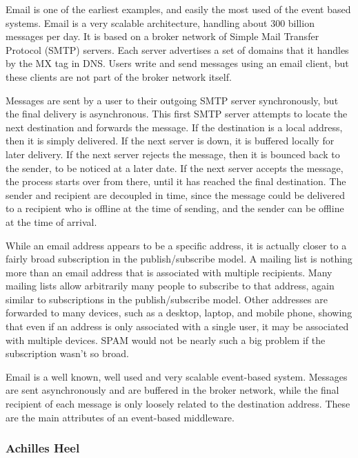 \documentclass{acm_proc_article-sp}
\begin{document}
Email is one of the earliest examples, and easily the most used of the event based systems. Email is a very scalable architecture, handling about 300 billion messages per day. It is based on a broker network of Simple Mail Transfer Protocol (SMTP) servers. Each server advertises a set of domains that it handles by the MX tag in DNS. Users write and send messages using an email client, but these clients are not part of the broker network itself.

Messages are sent by a user to their outgoing SMTP server synchronously, but the final delivery is asynchronous. This first SMTP server attempts to locate the next destination and forwards the message. If the destination is a local address, then it is simply delivered. If the next server is down, it is buffered locally for later delivery. If the next server rejects the message, then it is bounced back to the sender, to be noticed at a later date. If the next server accepts the message, the process starts over from there, until it has reached the final destination. The sender and recipient are decoupled in time, since the message could be delivered to a recipient who is offline at the time of sending, and the sender can be offline at the time of arrival.

While an email address appears to be a specific address, it is actually closer to a fairly broad subscription in the publish/subscribe model. A mailing list is nothing more than an email address that is associated with multiple recipients. Many mailing lists allow arbitrarily many people to subscribe to that address, again similar to subscriptions in the publish/subscribe model. Other addresses are forwarded to many devices, such as a desktop, laptop, and mobile phone, showing that even if an address is only associated with a single user, it may be associated with multiple devices. SPAM would not be nearly such a big problem if the subscription wasn't so broad.

Email is a well known, well used and very scalable event-based system. Messages are sent asynchronously and are buffered in the broker network, while the final recipient of each message is only loosely related to the destination address. These are the main attributes of an event-based middleware.



\subsubsection{Achilles Heel}
\end{document}
